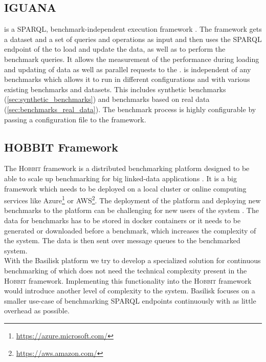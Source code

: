 \subsection{IGUANA}
\label{sec:iguana}
\iguana{} is a SPARQL, benchmark-independent execution framework \cite{conradsIguanaGenericFramework2017}.
The framework gets a dataset and a set of queries and operations as input and then uses the SPARQL endpoint of the \ts{} to load and update the data, as well as to perform the benchmark queries.
It allows the measurement of the performance during loading and updating of data as well as parallel requests to the \ts{}.
\iguana{} is independent of any benchmarks which allows it to run in different configurations and with various existing benchmarks and datasets.
This includes synthetic benchmarks (\ref{sec:synthetic_benchmarks}) and benchmarks based on real data (\ref{sec:benchmarks_real_data}).
The benchmark process is highly configurable by passing a configuration file to the \iguana{} framework.


\subsection{HOBBIT Framework}
The \textsc{Hobbit} framework is a distributed benchmarking platform designed to be able to scale up benchmarking for big linked-data applications \cite{roderHOBBITPlatformBenchmarking}.
It is a big framework which needs to be deployed on a local cluster or online computing services like Azure\footnote{\url{https://azure.microsoft.com/}} or AWS\footnote{\url{https://aws.amazon.com/}}.
The deployment of the platform and deploying new benchmarks to the platform can be challenging for new users of the system \cite{roderHOBBITPlatformBenchmarking}.
The data for benchmarks has to be stored in docker containers or it needs to be generated or downloaded before a benchmark, which increases the complexity of the system.
The data is then sent over message queues to the benchmarked system.
\\

With the Basilisk platform we try to develop a specialized solution for continuous benchmarking of \tsp{} which does not need the technical complexity present in the \textsc{Hobbit} framework.
Implementing this functionality into the \textsc{Hobbit} framework would introduce another level of complexity to the system.
Basilisk focuses on a smaller use-case of benchmarking SPARQL endpoints continuously with as little overhead as possible.

